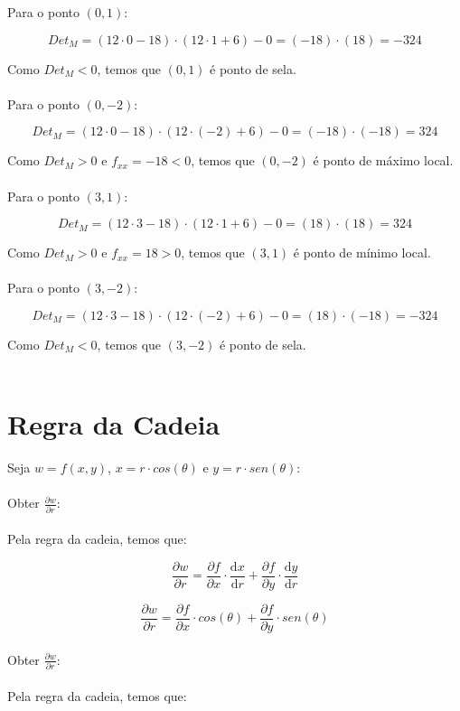 \documentclass[11pt]{article}
\begin{document}
Para o ponto $(0, 1)$:

$$Det_M = (12 \cdot 0 - 18)\cdot(12 \cdot 1 + 6) - 0 = (-18)\cdot(18) = -324$$

Como $Det_M < 0$, temos que $(0, 1)$ é ponto de sela.\\
\\

Para o ponto $(0, -2)$:

$$Det_M = (12 \cdot 0 - 18)\cdot(12 \cdot (-2) + 6) - 0 = (-18)\cdot(-18) = 324$$

Como $Det_M > 0$ e $f_{xx} = -18 < 0$, temos que $(0, -2)$ é ponto de máximo local.\\
\\

Para o ponto $(3, 1)$:

$$Det_M = (12 \cdot 3 - 18)\cdot(12 \cdot 1 + 6) - 0 = (18)\cdot(18) = 324$$

Como $Det_M > 0$ e $f_{xx} = 18 > 0$, temos que $(3, 1)$ é ponto de mínimo local.\\
\\

Para o ponto $(3, -2)$:

$$Det_M = (12 \cdot 3 - 18)\cdot(12 \cdot (-2) + 6) - 0 = (18)\cdot(-18) = -324$$

Como $Det_M < 0$, temos que $(3, -2)$ é ponto de sela.\\
\\

\section{Regra da Cadeia}

Seja $w = f(x, y)$, $x = r \cdot cos(\theta)$ e $y = r \cdot sen(\theta)$:\\
\\
Obter $\frac{\partial w}{\partial r}$:\\
\\
Pela regra da cadeia, temos que:

$$\frac{\partial w}{\partial r} = \frac{\partial f}{\partial x} \cdot \frac{\mathrm{d} x}{\mathrm{d} r} + \frac{\partial f}{\partial y} \cdot \frac{\mathrm{d} y}{\mathrm{d} r}$$

$$\frac{\partial w}{\partial r} = \frac{\partial f}{\partial x} \cdot cos(\theta) + \frac{\partial f}{\partial y} \cdot sen(\theta)$$
\\
Obter $\frac{\partial w}{\partial r}$:\\
\\
Pela regra da cadeia, temos que:
\end{document}
